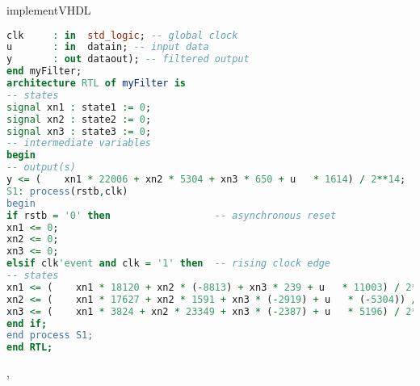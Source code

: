 \begin{command}{implementVHDL}
\begin{lstlisting}[language=VHDL]
clk     : in  std_logic; -- global clock
u       : in  datain; -- input data
y       : out dataout); -- filtered output
end myFilter;
architecture RTL of myFilter is
-- states
signal xn1 : state1 := 0;
signal xn2 : state2 := 0;
signal xn3 : state3 := 0;
-- intermediate variables
begin
-- output(s)
y <= (    xn1 * 22006 + xn2 * 5304 + xn3 * 650 + u   * 1614) / 2**14;
S1: process(rstb,clk)
begin
if rstb = '0' then                  -- asynchronous reset
xn1 <= 0;
xn2 <= 0;
xn3 <= 0;
elsif clk'event and clk = '1' then  -- rising clock edge
-- states
xn1 <= (    xn1 * 18120 + xn2 * (-8813) + xn3 * 239 + u   * 11003) / 2**15;
xn2 <= (    xn1 * 17627 + xn2 * 1591 + xn3 * (-2919) + u   * (-5304)) / 2**14;
xn3 <= (    xn1 * 3824 + xn2 * 23349 + xn3 * (-2387) + u   * 5196) / 2**15;
end if;
end process S1;
end RTL;
\end{lstlisting}
, 
\end{command}


